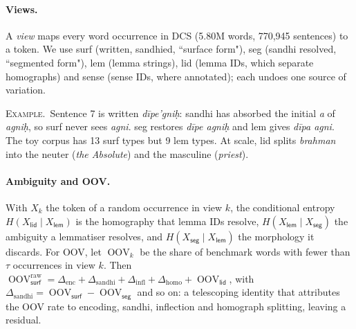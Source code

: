 \documentclass[11pt]{article}
\newcommand{\vk}[1]{\textsf{#1}}
\newcommand{\OOV}{\operatorname{OOV}}
\newcommand{\ex}{\par\smallskip\noindent\textsc{Example.}~}
\begin{document}
\paragraph{Views.} A \emph{view} maps every word occurrence in DCS
(5.80M words, 770,945 sentences) to a token. We use \vk{surf} (written,
sandhied, ``surface form"), \vk{seg} (sandhi resolved, ``segmented form"),
\vk{lem} (lemma strings), \vk{lid} (lemma IDs, which separate homographs)
and \vk{sense} (sense IDs, where annotated); each undoes one source of
variation.

\ex Sentence 7 is written \emph{dīpe'gniḥ}: sandhi has absorbed the initial
\emph{a} of \emph{agniḥ}, so \vk{surf} never sees \emph{agni}. \vk{seg}
restores \emph{dīpe agniḥ} and \vk{lem} gives \emph{dīpa agni}. The toy
corpus has 13 \vk{surf} types but 9 \vk{lem} types. At scale, \vk{lid}
splits \emph{brahman} into the neuter (\emph{the Absolute}) and the
masculine (\emph{priest}).

\paragraph{Ambiguity and OOV.} With $X_k$ the token of a random occurrence
in view $k$, the conditional entropy $H(X_{\vk{lid}}\mid X_{\vk{lem}})$ is
the homography that lemma IDs resolve, $H(X_{\vk{lem}}\mid X_{\vk{seg}})$
the ambiguity a lemmatiser resolves, and $H(X_{\vk{seg}}\mid X_{\vk{lem}})$
the morphology it discards. For OOV, let $\OOV_k$ be the share of benchmark
words with fewer than $\tau$ occurrences in view $k$. Then
$\OOV^{\mathrm{raw}}_{\vk{surf}}=\Delta_{\mathrm{enc}}+\Delta_{\mathrm{sandhi}}
+\Delta_{\mathrm{infl}}+\Delta_{\mathrm{homo}}+\OOV_{\vk{lid}}$, with
$\Delta_{\mathrm{sandhi}}=\OOV_{\vk{surf}}-\OOV_{\vk{seg}}$ and so on: a
telescoping identity that attributes the OOV rate to encoding, sandhi,
inflection and homograph splitting, leaving a residual.
\end{document}
